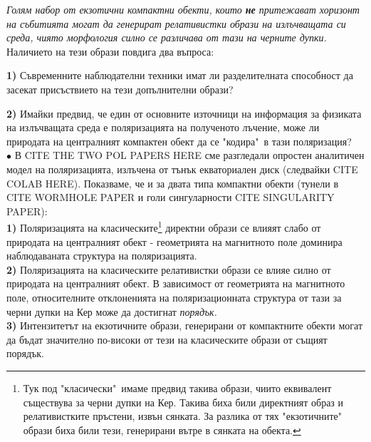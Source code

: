 \emph{Голям набор от екзотични компактни обекти, които \textbf{не} притежават хоризонт на събитията могат да генерират релативистки образи на излъчващата си среда, чиято морфология силно се различава от тази на черните дупки.}\\

\noindent Наличието на тези образи повдига два въпроса:\\\newline

\noindent\textbf{1)} Съвременните наблюдателни техники имат ли разделителната способност да засекат присъствието на тези допълнителни образи?\newline

\noindent\textbf{2)} Имайки предвид, че един от основните източници на информация за физиката на излъчващата среда е поляризацията на полученото лъчение, може ли природата на централният компактен обект да се "кодира"$\,$ в тази поляризация?\\\newline
$\bullet$ В CITE THE TWO POL PAPERS HERE сме разгледали опростен аналитичен модел на поляризацията, излъчена от тънък екваториален диск (следвайки CITE COLAB HERE). Показваме, че и за двата типа компактни обекти (тунели в CITE WORMHOLE PAPER и голи сингуларности CITE SINGULARITY PAPER):\\\newline
\textbf{1)} Поляризацията на класическите\footnote{Тук под "класически"$\,$ имаме предвид такива образи, чиито еквивалент съществува за черни дупки на Кер. Такива биха били директният образ и релативистките пръстени, извън сянката. За разлика от тях "екзотичните"$\,$ образи биха били тези, генерирани вътре в сянката на обекта.} директни образи се влияят слабо от природата на централният обект - геометрията на магнитното поле доминира наблюдаваната структура на поляризацията.\\\newline
\textbf{2)} Поляризацията на класическите релативистки образи се влияе силно от природата на централният обект. В зависимост от геометрията на магнитното поле, относителните отклоненията на поляризационната структура от тази за черни дупки на Кер може да достигнат 
\emph{порядък.}\\\newline
\textbf{3)} Интензитетът на екзотичните образи, генерирани от компактните обекти могат да бъдат значително по-високи от тези на класическите образи от същият порядък.\\\newline
